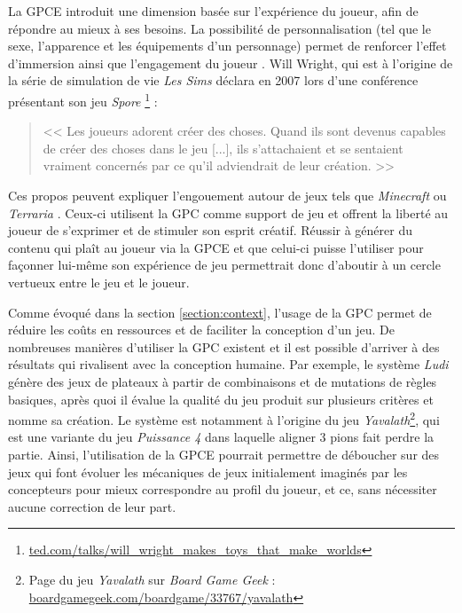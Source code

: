 \documentclass[a4paper,11pt]{article}
\begin{document}
      La GPCE introduit une dimension basée sur l'expérience du joueur, afin de répondre au mieux à ses besoins.
      La possibilité de personnalisation (tel que le sexe, l'apparence et les équipements d'un personnage) permet de renforcer l'effet d'immersion ainsi que l'engagement du joueur \cite{Teng}.
      Will Wright, qui est à l'origine de la série de simulation de vie \textit{Les Sims} \cite{game:Sims} déclara en 2007 lors d'une conférence présentant son jeu \textit{Spore} \cite{game:Spore} \footnote{\url{ted.com/talks/will_wright_makes_toys_that_make_worlds}} :
      
      \begin{quote}
        \vspace{-1em}
        << Les joueurs adorent créer des choses.
        Quand ils sont devenus capables de créer des choses dans le jeu [...], ils s'attachaient et se sentaient vraiment concernés par ce qu'il adviendrait de leur création. >>
        \vspace{-1em}
      \end{quote}
      
      Ces propos peuvent expliquer l'engouement autour de jeux tels que \textit{Minecraft} \cite{game:Minecraft} ou \textit{Terraria} \cite{game:Terraria}.
      Ceux-ci utilisent la GPC comme support de jeu et offrent la liberté au joueur de s'exprimer et de stimuler son esprit créatif.
      Réussir à générer du contenu qui plaît au joueur via la GPCE et que celui-ci puisse l'utiliser pour façonner lui-même son expérience de jeu permettrait donc d'aboutir à un cercle vertueux entre le jeu et le joueur.

      Comme évoqué dans la section \ref{section:context}, l'usage de la GPC permet de réduire les coûts en ressources et de faciliter la conception d'un jeu.
      De nombreuses manières d'utiliser la GPC existent \cite{Craveirinha} et il est possible d'arriver à des résultats qui rivalisent avec la conception humaine.
      Par exemple, le système \textit{Ludi} \cite{Browne} génère des jeux de plateaux à partir de combinaisons et de mutations de règles basiques, après quoi il évalue la qualité du jeu produit sur plusieurs critères et nomme sa création.
      Le système est notamment à l'origine du jeu \textit{Yavalath}\footnote{Page du jeu \textit{Yavalath} sur \textit{Board Game Geek} : \url{boardgamegeek.com/boardgame/33767/yavalath}}, qui est une variante du jeu \textit{Puissance 4} dans laquelle aligner 3 pions fait perdre la partie. 
      Ainsi, l'utilisation de la GPCE pourrait permettre de déboucher sur des jeux qui font évoluer les mécaniques de jeux initialement imaginés par les concepteurs pour mieux correspondre au profil du joueur, et ce, sans nécessiter aucune correction de leur part.
\end{document}
